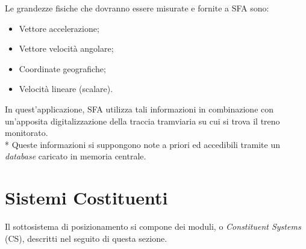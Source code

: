 Le grandezze fisiche che dovranno essere misurate e fornite a SFA sono:
\begin{itemize}
	\item Vettore accelerazione;
	\item Vettore velocit\`a angolare;
	\item Coordinate geografiche;
	\item Velocit\`a lineare (scalare).
\end{itemize}
In quest'applicazione, SFA utilizza tali informazioni in combinazione con un'apposita digitalizzazione della traccia tramviaria su cui si trova il treno monitorato.\cite{sfaimugps}\cite{sfaimuodo}\cite{sfaimuodogps} \\* Queste informazioni si suppongono note a priori ed accedibili tramite un \emph{database} caricato in memoria centrale. \cite{sqlite3}
\section{Sistemi Costituenti}
Il sottosistema di posizionamento si compone dei moduli, o \emph{Constituent Systems} (CS), descritti nel seguito di questa sezione.
